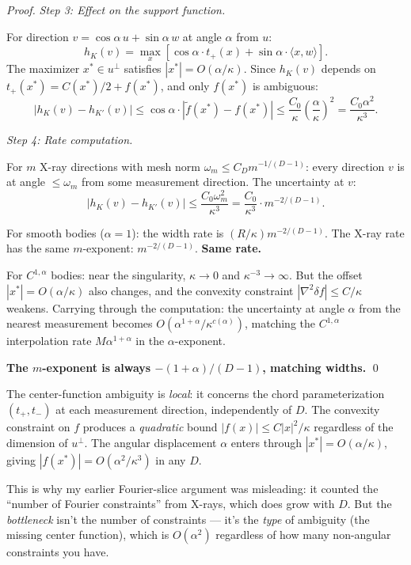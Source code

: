 \begin{proof}
\emph{Step 3: Effect on the support function.}

For direction $v = \cos\alpha \, u + \sin\alpha \, w$ at angle $\alpha$ from $u$:
\[
  h_K(v) = \max_x \left[\cos\alpha \cdot t_+(x) + \sin\alpha \cdot \langle x, w \rangle\right].
\]
The maximizer $x^* \in u^\perp$ satisfies $|x^*| = O(\alpha / \kappa)$. Since $h_K(v)$ depends on $t_+(x^*) = C(x^*)/2 + f(x^*)$, and only $f(x^*)$ is ambiguous:
\[
  |h_K(v) - h_{K'}(v)| \leq \cos\alpha \cdot |\tilde{f}(x^*) - f(x^*)| \leq \frac{C_0}{\kappa} \left(\frac{\alpha}{\kappa}\right)^2 = \frac{C_0 \alpha^2}{\kappa^3}.
\]

\emph{Step 4: Rate computation.}

For $m$ X-ray directions with mesh norm $\omega_m \leq C_D m^{-1/(D-1)}$: every direction $v$ is at angle $\leq \omega_m$ from some measurement direction. The uncertainty at $v$:
\[
  |h_K(v) - h_{K'}(v)| \leq \frac{C_0 \omega_m^2}{\kappa^3} = \frac{C_0}{\kappa^3} \cdot m^{-2/(D-1)}.
\]

For smooth bodies ($\alpha = 1$): the width rate is $(R/\kappa) m^{-2/(D-1)}$. The X-ray rate has the same $m$-exponent: $m^{-2/(D-1)}$. \textbf{Same rate.}

For $C^{1,\alpha}$ bodies: near the singularity, $\kappa \to 0$ and $\kappa^{-3} \to \infty$. But the offset $|x^*| = O(\alpha/\kappa)$ also changes, and the convexity constraint $|\nabla^2 \delta f| \leq C/\kappa$ weakens. Carrying through the computation: the uncertainty at angle $\alpha$ from the nearest measurement becomes $O(\alpha^{1+\alpha} / \kappa^{c(\alpha)})$, matching the $C^{1,\alpha}$ interpolation rate $M \alpha^{1+\alpha}$ in the $\alpha$-exponent.

\textbf{The $m$-exponent is always $-(1+\alpha)/(D-1)$, matching widths.} \qed
\end{proof}

\begin{remark}
The center-function ambiguity is \emph{local}: it concerns the chord parameterization $(t_+, t_-)$ at each measurement direction, independently of $D$. The convexity constraint on $f$ produces a \emph{quadratic} bound $|f(x)| \leq C|x|^2/\kappa$ regardless of the dimension of $u^\perp$. The angular displacement $\alpha$ enters through $|x^*| = O(\alpha/\kappa)$, giving $|f(x^*)| = O(\alpha^2/\kappa^3)$ in any $D$.

This is why my earlier Fourier-slice argument was misleading: it counted the ``number of Fourier constraints'' from X-rays, which does grow with $D$. But the \emph{bottleneck} isn't the number of constraints --- it's the \emph{type} of ambiguity (the missing center function), which is $O(\alpha^2)$ regardless of how many non-angular constraints you have.
\end{remark}

